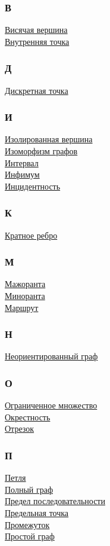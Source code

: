 \begin{multicols}{3}
\subsubsection*{В} \noindent
\hyperlink{def:leaf_vertex}{Висячая вершина} \\
\hyperlink{def:interior_point}{Внутренняя точка}
\subsubsection*{Д} \noindent
\hyperlink{def:discrete_point}{Дискретная точка}
\subsubsection*{И} \noindent
\hyperlink{def:isolated_vertex}{Изолированная вершина} \\
\hyperlink{def:graph_isomorphism}{Изоморфизм графов} \\
\hyperlink{def:open_interval}{Интервал} \\
\hyperlink{def:infimum}{Инфимум} \\
\hyperlink{def:incidence}{Инцидентность}
\subsubsection*{К} \noindent
\hyperlink{def:multiple_edge}{Кратное ребро}
\subsubsection*{М} \noindent
\hyperlink{def:majorant}{Мажоранта} \\
\hyperlink{def:minorant}{Миноранта} \\
\hyperlink{def:walk}{Маршрут}
\subsubsection*{Н} \noindent
\hyperlink{def:undirected_graph}{Неориентированный граф}
\subsubsection*{О} \noindent
\hyperlink{def:bounded_set}{Ограниченное множество} \\
\hyperlink{def:neighbourhood}{Окрестность} \\
\hyperlink{def:closed_interval}{Отрезок}
\subsubsection*{П} \noindent
\hyperlink{def:loop}{Петля} \\
\hyperlink{def:complete_graph}{Полный граф} \\
\hyperlink{def:limit_of_sequence}{Предел последовательности} \\
\hyperlink{def:limit_point}{Предельная точка} \\
\hyperlink{def:interval}{Промежуток} \\
\hyperlink{def:simple_graph}{Простой граф}

\end{multicols}
